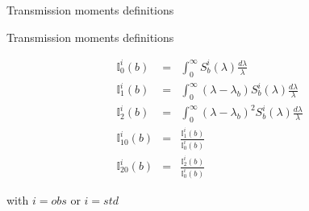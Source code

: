 \documentclass{beamer}
\begin{document}
\begin{frame}{Transmission moments definitions}
\begin{block}{Transmission moments definitions}

\begin{eqnarray}
\mathbb{I}_0^i(b) & = & \int_0^{\infty} S_b^i(\lambda) \frac{d\lambda}{\lambda} \\
\mathbb{I}_1^i(b) & = & \int_0^{\infty} (\lambda-\lambda_b) S_b^i(\lambda) \frac{d\lambda}{\lambda} \\
 \mathbb{I}_2^i(b) & = &\int_0^{\infty} (\lambda-\lambda_b)^2 S_b^i(\lambda) \frac{d\lambda}{\lambda} \\
\mathbb{I}^i_{10}(b)  & = &\frac{\mathbb{I}^i_1(b)}{\mathbb{I}^i_0(b)} \\
\mathbb{I}^i_{20}(b) & = & \frac{\mathbb{I}^i_2(b)}{\mathbb{I}^i_0(b)} 
\end{eqnarray}

with $i=obs$ or $i=std$
\end{block}
\end{frame}
\end{document}
